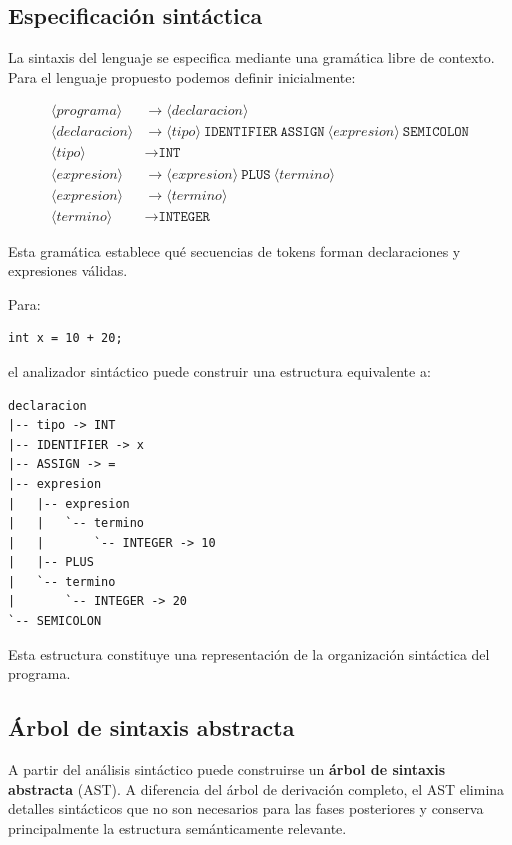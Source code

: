 \documentclass[11pt,a4paper]{article}
\begin{document}
\subsection{Especificación sintáctica}

La sintaxis del lenguaje se especifica mediante una gramática libre de
contexto. Para el lenguaje propuesto podemos definir inicialmente:

\begin{align*}
\langle programa \rangle
    &\rightarrow \langle declaracion \rangle \\[4pt]
\langle declaracion \rangle
    &\rightarrow
    \langle tipo \rangle
    \ \texttt{IDENTIFIER}
    \ \texttt{ASSIGN}
    \ \langle expresion \rangle
    \ \texttt{SEMICOLON} \\[4pt]
\langle tipo \rangle
    &\rightarrow \texttt{INT} \\[4pt]
\langle expresion \rangle
    &\rightarrow
    \langle expresion \rangle
    \ \texttt{PLUS}
    \ \langle termino \rangle \\[4pt]
\langle expresion \rangle
    &\rightarrow \langle termino \rangle \\[4pt]
\langle termino \rangle
    &\rightarrow \texttt{INTEGER}
\end{align*}

Esta gramática establece qué secuencias de tokens forman declaraciones y
expresiones válidas.

Para:

\begin{lstlisting}
int x = 10 + 20;
\end{lstlisting}

el analizador sintáctico puede construir una estructura equivalente a:

\begin{lstlisting}
declaracion
|-- tipo -> INT
|-- IDENTIFIER -> x
|-- ASSIGN -> =
|-- expresion
|   |-- expresion
|   |   `-- termino
|   |       `-- INTEGER -> 10
|   |-- PLUS
|   `-- termino
|       `-- INTEGER -> 20
`-- SEMICOLON
\end{lstlisting}

Esta estructura constituye una representación de la organización sintáctica
del programa.

\subsection{Árbol de sintaxis abstracta}

A partir del análisis sintáctico puede construirse un
\textbf{árbol de sintaxis abstracta} (AST). A diferencia del árbol de
derivación completo, el AST elimina detalles sintácticos que no son
necesarios para las fases posteriores y conserva principalmente la estructura
semánticamente relevante.
\end{document}
